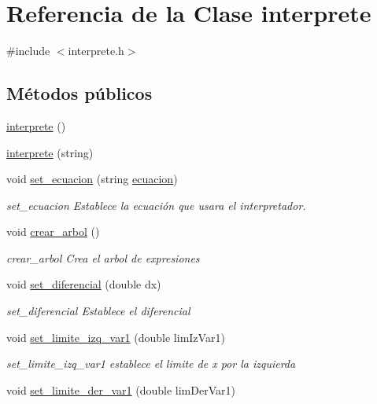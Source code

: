 \hypertarget{classinterprete}{}\section{Referencia de la Clase interprete}
\label{classinterprete}


{\ttfamily \#include $<$interprete.\+h$>$}

\subsection*{Métodos públicos}
\begin{DoxyCompactItemize}
\item 
\hyperlink{classinterprete_ad2550863832396241b4204a2e241b103}{interprete} ()
\item 
\hyperlink{classinterprete_abbbd7bd94d2767f7060ed549639ce8bc}{interprete} (string)
\item 
void \hyperlink{classinterprete_ab765b1c2d06041dce0f7504783ce5cf5}{set\+\_\+ecuacion} (string \hyperlink{classinterprete_ab268b0d71f72cd82f186376c17444543}{ecuacion})
\begin{DoxyCompactList}\small\item\em set\+\_\+ecuacion Establece la ecuación que usara el interpretador. \end{DoxyCompactList}\item 
void \hyperlink{classinterprete_a7e769b650b97490605a3773d0d26f2c5}{crear\+\_\+arbol} ()
\begin{DoxyCompactList}\small\item\em crear\+\_\+arbol Crea el arbol de expresiones \end{DoxyCompactList}\item 
void \hyperlink{classinterprete_ab88c3854e225bd308c2f00810072aba7}{set\+\_\+diferencial} (double dx)
\begin{DoxyCompactList}\small\item\em set\+\_\+diferencial Establece el diferencial \end{DoxyCompactList}\item 
void \hyperlink{classinterprete_af31ffc60b4d5d31f04eb846a4caa6697}{set\+\_\+limite\+\_\+izq\+\_\+var1} (double lim\+Iz\+Var1)
\begin{DoxyCompactList}\small\item\em set\+\_\+limite\+\_\+izq\+\_\+var1 establece el limite de x por la izquierda \end{DoxyCompactList}\item 
void \hyperlink{classinterprete_a3bb4261f5515b6c65910c2c674965019}{set\+\_\+limite\+\_\+der\+\_\+var1} (double lim\+Der\+Var1)

\end{DoxyCompactItemize}
